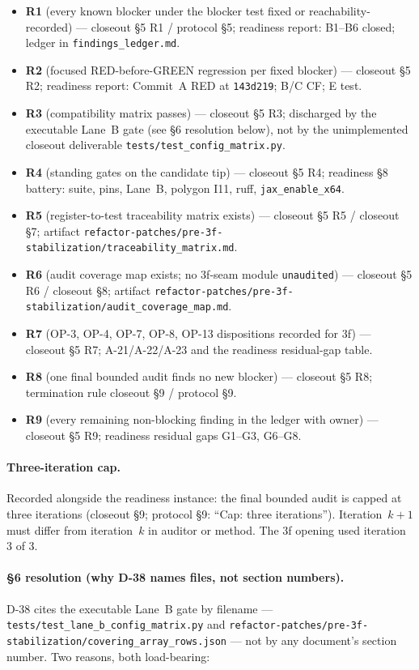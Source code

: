 \documentclass[
  10pt,
]{article}
\providecommand{\tightlist}{%
  \setlength{\itemsep}{0pt}\setlength{\parskip}{0pt}}
\begin{document}
\begin{itemize}
\tightlist
\item \textbf{R1} (every known blocker under the blocker test fixed or reachability-recorded) --- closeout §5 R1 / protocol §5; readiness report: B1--B6 closed; ledger in \texttt{findings\_ledger.md}.
\item \textbf{R2} (focused RED-before-GREEN regression per fixed blocker) --- closeout §5 R2; readiness report: Commit~A RED at \texttt{143d219}; B/C CF; E test.
\item \textbf{R3} (compatibility matrix passes) --- closeout §5 R3; discharged by the executable Lane~B gate (see §6 resolution below), not by the unimplemented closeout deliverable \texttt{tests/test\_config\_matrix.py}.
\item \textbf{R4} (standing gates on the candidate tip) --- closeout §5 R4; readiness §8 battery: suite, pins, Lane~B, polygon I11, ruff, \texttt{jax\_enable\_x64}.
\item \textbf{R5} (register-to-test traceability matrix exists) --- closeout §5 R5 / closeout §7; artifact \texttt{refactor-patches/pre-3f-stabilization/traceability\_matrix.md}.
\item \textbf{R6} (audit coverage map exists; no 3f-seam module \texttt{unaudited}) --- closeout §5 R6 / closeout §8; artifact \texttt{refactor-patches/pre-3f-stabilization/audit\_coverage\_map.md}.
\item \textbf{R7} (OP-3, OP-4, OP-7, OP-8, OP-13 dispositions recorded for 3f) --- closeout §5 R7; A-21/A-22/A-23 and the readiness residual-gap table.
\item \textbf{R8} (one final bounded audit finds no new blocker) --- closeout §5 R8; termination rule closeout §9 / protocol §9.
\item \textbf{R9} (every remaining non-blocking finding in the ledger with owner) --- closeout §5 R9; readiness residual gaps G1--G3, G6--G8.
\end{itemize}

\paragraph{Three-iteration cap.}
Recorded alongside the readiness instance: the final bounded audit is capped at three iterations (closeout §9; protocol §9: ``Cap: three iterations''). Iteration~$k{+}1$ must differ from iteration~$k$ in auditor or method. The 3f opening used iteration 3 of 3.

\paragraph{§6 resolution (why D-38 names files, not section numbers).}
D-38 cites the executable Lane~B gate by filename --- \texttt{tests/test\_lane\_b\_config\_matrix.py} and \texttt{refactor-patches/pre-3f-stabilization/covering\_array\_rows.json} --- not by any document's section number. Two reasons, both load-bearing:
\end{document}
